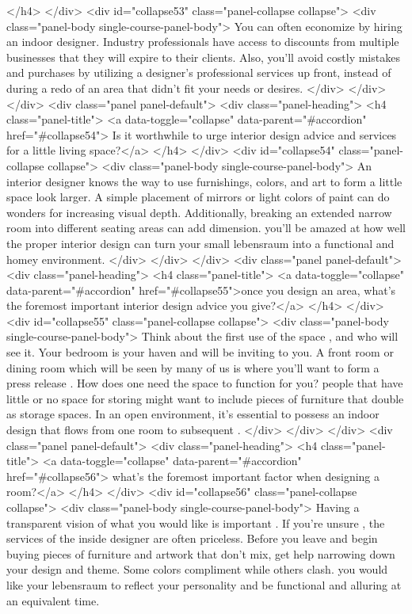 {</h4>
</div>
<div id="collapse53" class="panel-collapse collapse">
<div class="panel-body single-course-panel-body">
You can often economize by hiring an indoor designer. Industry professionals have access to discounts from multiple businesses that they will expire to their clients. Also, you'll avoid costly mistakes and purchases by utilizing a designer’s professional services up front, instead of during a redo of an area that didn't fit your needs or desires. </div>
</div>
</div>
<div class="panel panel-default">
<div class="panel-heading">
<h4 class="panel-title">
<a data-toggle="collapse" data-parent="#accordion" href="#collapse54"> Is it worthwhile to urge interior design advice and services for a little living space?</a>
</h4>
</div>
<div id="collapse54" class="panel-collapse collapse">
<div class="panel-body single-course-panel-body">
An interior designer knows the way to use furnishings, colors, and art to form a little space look larger. A simple placement of mirrors or light colors of paint can do wonders for increasing visual depth. Additionally, breaking an extended narrow room into different seating areas can add dimension. you'll be amazed at how well the proper interior design can turn your small lebensraum into a functional and homey environment.
</div>
</div>
</div>
<div class="panel panel-default">
<div class="panel-heading">
<h4 class="panel-title">
<a data-toggle="collapse" data-parent="#accordion" href="#collapse55">once you design an area, what's the foremost important interior design advice you give?</a>
</h4>
</div>
<div id="collapse55" class="panel-collapse collapse">
<div class="panel-body single-course-panel-body">
Think about the first use of the space , and who will see it. Your bedroom is your haven and will be inviting to you. A front room or dining room which will be seen by many of us is where you'll want to form a press release . How does one need the space to function for you? people that have little or no space for storing might want to include pieces of furniture that double as storage spaces. In an open environment, it's essential to possess an indoor design that flows from one room to subsequent .
</div>
</div>
</div>
<div class="panel panel-default">
<div class="panel-heading">
<h4 class="panel-title">
<a data-toggle="collapse" data-parent="#accordion" href="#collapse56"> what's the foremost important factor when designing a room?</a>
</h4>
</div>
<div id="collapse56" class="panel-collapse collapse">
 <div class="panel-body single-course-panel-body">
Having a transparent vision of what you would like is important . If you're unsure , the services of the inside designer are often priceless. Before you leave and begin buying pieces of furniture and artwork that don't mix, get help narrowing down your design and theme. Some colors compliment while others clash. you would like your lebensraum to reflect your personality and be functional and alluring at an equivalent time.
}
